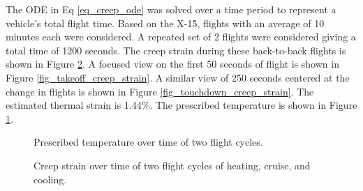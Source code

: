 \documentclass[conf]{new-aiaa}
\begin{document}
The ODE in Eq \ref{eq_creep_ode} was solved over a time period to represent a
vehicle's total flight time.
Based on the X-15, flights with an average of 10 minutes each 
\cite{ kordes_structureal_heating_experiencs_on_the_x15_airplane}
were considered.
A repeated set of 2 flights were considered giving a total time of 1200 seconds.
The creep strain during these back-to-back flights is shown in Figure
\ref{fig_creep_strain}.
A focused view on the first 50 seconds of flight is shown 
in Figure \ref{fig_takeoff_creep_strain}.
A similar view of 250 seconds centered at the change in flights is 
shown in Figure \ref{fig_touchdown_creep_strain}.
The estimated thermal strain is 1.44\%.
The prescribed temperature is shown in Figure \ref{fig_full_temperature}.

\begin{figure}[H]
  \centering
  \caption{ Prescribed temperature over time of two flight cycles.}
  \label{fig_full_temperature}
\end{figure}

\begin{figure}[H]
  \centering
  \caption{ Creep strain over time of two flight cycles of heating, cruise, and cooling.}
  \label{fig_creep_strain}
\end{figure}
\end{document}
